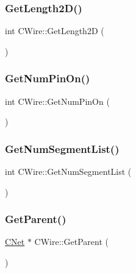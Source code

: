 \mbox{\label{classCWire_a54f754e7404cb275e2eed0e8b281817f}} 
\subsubsection{\texorpdfstring{GetLength2D()}{GetLength2D()}}
{\footnotesize\ttfamily int C\+Wire\+::\+Get\+Length2D (\begin{DoxyParamCaption}{ }\end{DoxyParamCaption})}

\mbox{\label{classCWire_a095a9358f9fe790d5010fef23a8a209e}} 
\subsubsection{\texorpdfstring{GetNumPinOn()}{GetNumPinOn()}}
{\footnotesize\ttfamily int C\+Wire\+::\+Get\+Num\+Pin\+On (\begin{DoxyParamCaption}{ }\end{DoxyParamCaption})}

\mbox{\label{classCWire_a715cef9442c9cc6b45259c7291b84209}} 
\subsubsection{\texorpdfstring{GetNumSegmentList()}{GetNumSegmentList()}}
{\footnotesize\ttfamily int C\+Wire\+::\+Get\+Num\+Segment\+List (\begin{DoxyParamCaption}{ }\end{DoxyParamCaption})}

\mbox{\label{classCWire_a98ece8df0778eb16cf0690c4aa5352f0}} 
\subsubsection{\texorpdfstring{GetParent()}{GetParent()}}
{\footnotesize\ttfamily \mbox{\hyperlink{classCNet}{C\+Net}} $\ast$ C\+Wire\+::\+Get\+Parent (\begin{DoxyParamCaption}{ }\end{DoxyParamCaption})\hspace{0.3cm}{\ttfamily [inline]}}

